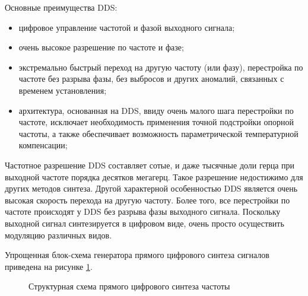         Основные преимущества DDS:  
        \begin{itemize}
            \item цифровое управление частотой и фазой выходного сигнала;
            \item очень высокое разрешение по частоте и фазе;
            \item экстремально быстрый переход на другую частоту (или фазу),
                перестройка по частоте без разрыва фазы,  без выбросов и других
                аномалий,  связанных с временем установления;
            \item архитектура,  основанная на DDS,  ввиду очень малого шага
                перестройки по частоте, исключает необходимость применения
                точной подстройки опорной частоты,  а также обеспечивает
                возможность параметрической температурной компенсации;
        \end{itemize}

        Частотное разрешение DDS  составляет сотые,  и даже тысячные доли герца
        при выходной частоте порядка десятков мегагерц.  Такое разрешение
        недостижимо для других методов синтеза. Другой характерной особенностью
        DDS  является очень высокая скорость перехода на другую частоту.  Более
        того,  все перестройки по частоте происходят у DDS  без разрыва фазы
        выходного сигнала.  Поскольку выходной сигнал синтезируется в цифровом
        виде,  очень просто осуществить модуляцию различных видов.

        Упрощенная блок-схема генератора прямого цифрового синтеза сигналов
        приведена на рисунке \ref{fig:dds-structure}. 

        \begin{figure}[h!]
            \caption{Структурная схема прямого цифрового синтеза частоты}
            \label{fig:dds-structure}
        \end{figure}

